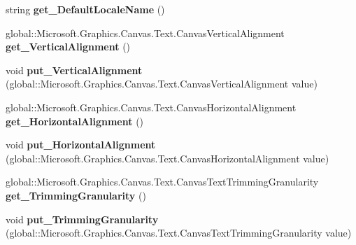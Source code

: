 \begin{DoxyCompactItemize}
string {\bfseries get\+\_\+\+Default\+Locale\+Name} ()
\item 
\mbox{\label{interface_microsoft_1_1_graphics_1_1_canvas_1_1_text_1_1_i_canvas_text_layout_ab4a563e714253a63ce04baf03dcc74d1}} 
global\+::\+Microsoft.\+Graphics.\+Canvas.\+Text.\+Canvas\+Vertical\+Alignment {\bfseries get\+\_\+\+Vertical\+Alignment} ()
\item 
\mbox{\label{interface_microsoft_1_1_graphics_1_1_canvas_1_1_text_1_1_i_canvas_text_layout_a739a2321aadcdbc5778eb75fff7a82d6}} 
void {\bfseries put\+\_\+\+Vertical\+Alignment} (global\+::\+Microsoft.\+Graphics.\+Canvas.\+Text.\+Canvas\+Vertical\+Alignment value)
\item 
\mbox{\label{interface_microsoft_1_1_graphics_1_1_canvas_1_1_text_1_1_i_canvas_text_layout_a0eca2347bb72344130499308b22b5c75}} 
global\+::\+Microsoft.\+Graphics.\+Canvas.\+Text.\+Canvas\+Horizontal\+Alignment {\bfseries get\+\_\+\+Horizontal\+Alignment} ()
\item 
\mbox{\label{interface_microsoft_1_1_graphics_1_1_canvas_1_1_text_1_1_i_canvas_text_layout_a1ed48a95cc077705f220f440b7d0ec96}} 
void {\bfseries put\+\_\+\+Horizontal\+Alignment} (global\+::\+Microsoft.\+Graphics.\+Canvas.\+Text.\+Canvas\+Horizontal\+Alignment value)
\item 
\mbox{\label{interface_microsoft_1_1_graphics_1_1_canvas_1_1_text_1_1_i_canvas_text_layout_a0e97f065a5957e5937f383d4e8676d1f}} 
global\+::\+Microsoft.\+Graphics.\+Canvas.\+Text.\+Canvas\+Text\+Trimming\+Granularity {\bfseries get\+\_\+\+Trimming\+Granularity} ()
\item 
\mbox{\label{interface_microsoft_1_1_graphics_1_1_canvas_1_1_text_1_1_i_canvas_text_layout_a6159ff2880908ea328720398d78bb388}} 
void {\bfseries put\+\_\+\+Trimming\+Granularity} (global\+::\+Microsoft.\+Graphics.\+Canvas.\+Text.\+Canvas\+Text\+Trimming\+Granularity value)

\end{DoxyCompactItemize}
